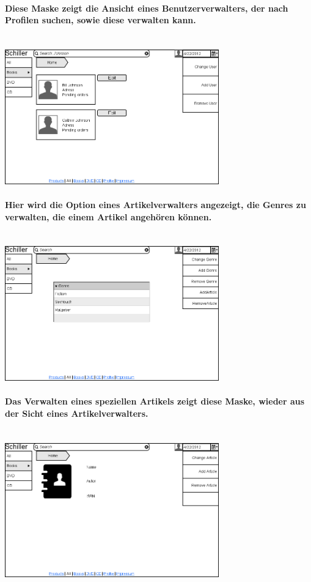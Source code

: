 \documentclass[a4paper]{article}
\begin{document}
\paragraph{Diese Maske zeigt die Ansicht eines Benutzerverwalters, der nach Profilen suchen, sowie diese verwalten kann.\\ \\}
\includegraphics[width=350px]{15ChangeUser.png}

\paragraph{Hier wird die Option eines Artikelverwalters angezeigt, die Genres zu verwalten, die einem Artikel angehören können.\\ \\}
\includegraphics[width=350px]{16ChangeGenre.png}

\paragraph{Das Verwalten eines speziellen Artikels zeigt diese Maske, wieder aus der Sicht eines Artikelverwalters.\\ \\}
\includegraphics[width=350px]{17ChangeArticle.png}
\end{document}
